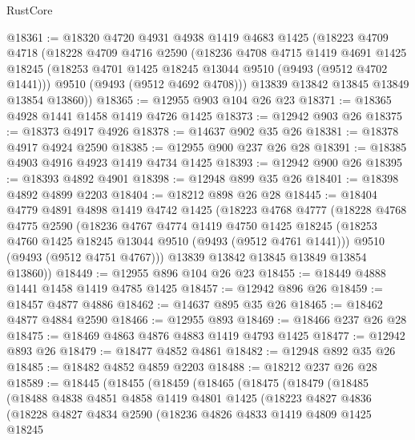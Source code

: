 \begin{lexlean}{RustCore}
\begin{coremodule}
@18361 := @18320
    @4720
    @4931
    @4938
    @1419
    @4683
    @1425
    (@18223
      @4709
      @4718
      (@18228
        @4709
        @4716
        @2590
        (@18236
          @4708
          @4715
          @1419
          @4691
          @1425
          @18245
          (@18253 @4701 @1425 @18245 @13044 @9510 (@9493 (@9512 @4702 @1441)))
          @9510
          (@9493 (@9512 @4692 @4708)))
        @13839
        @13842
        @13845
        @13849
        @13854
        @13860))
@18365 := @12955 @903 @104 @26 @23
@18371 := @18365 @4928 @1441 @1458 @1419 @4726 @1425
@18373 := @12942 @903 @26
@18375 := @18373 @4917 @4926
@18378 := @14637 @902 @35 @26
@18381 := @18378 @4917 @4924 @2590
@18385 := @12955 @900 @237 @26 @28
@18391 := @18385 @4903 @4916 @4923 @1419 @4734 @1425
@18393 := @12942 @900 @26
@18395 := @18393 @4892 @4901
@18398 := @12948 @899 @35 @26
@18401 := @18398 @4892 @4899 @2203
@18404 := @18212 @898 @26 @28
@18445 := @18404
    @4779
    @4891
    @4898
    @1419
    @4742
    @1425
    (@18223
      @4768
      @4777
      (@18228
        @4768
        @4775
        @2590
        (@18236
          @4767
          @4774
          @1419
          @4750
          @1425
          @18245
          (@18253 @4760 @1425 @18245 @13044 @9510 (@9493 (@9512 @4761 @1441)))
          @9510
          (@9493 (@9512 @4751 @4767)))
        @13839
        @13842
        @13845
        @13849
        @13854
        @13860))
@18449 := @12955 @896 @104 @26 @23
@18455 := @18449 @4888 @1441 @1458 @1419 @4785 @1425
@18457 := @12942 @896 @26
@18459 := @18457 @4877 @4886
@18462 := @14637 @895 @35 @26
@18465 := @18462 @4877 @4884 @2590
@18466 := @12955 @893
@18469 := @18466 @237 @26 @28
@18475 := @18469 @4863 @4876 @4883 @1419 @4793 @1425
@18477 := @12942 @893 @26
@18479 := @18477 @4852 @4861
@18482 := @12948 @892 @35 @26
@18485 := @18482 @4852 @4859 @2203
@18488 := @18212 @237 @26 @28
@18589 := @18445
    (@18455
      (@18459
        (@18465
          (@18475
            (@18479
              (@18485
                (@18488
                  @4838
                  @4851
                  @4858
                  @1419
                  @4801
                  @1425
                  (@18223
                    @4827
                    @4836
                    (@18228
                      @4827
                      @4834
                      @2590
                      (@18236
                        @4826
                        @4833
                        @1419
                        @4809
                        @1425
                        @18245

\end{coremodule}
\end{lexlean}

